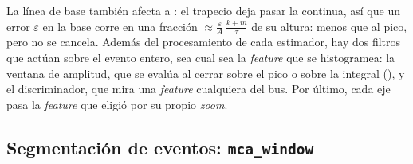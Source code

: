 La línea de base también afecta a : el trapecio deja pasar la
continua, así que un error $\varepsilon$ en la base corre  en una
fracción $\approx \frac{\varepsilon}{A}\,\frac{k+m}{\tau}$ de su altura: menos
que al pico, pero no se cancela. Además del procesamiento de cada estimador, hay
dos filtros que actúan sobre el evento entero, sea cual sea la \emph{feature} que se
histogramea: la ventana de amplitud, que se evalúa al cerrar sobre el pico o
sobre la integral (), y el discriminador, que mira una
\emph{feature} cualquiera del bus. Por último, cada eje pasa la \emph{feature} que eligió por
su propio \emph{zoom}.

\subsection{Segmentación de eventos:
\texorpdfstring{\texttt{mca\_window}}{mca\_window}}
\label{S:implmca-window}

